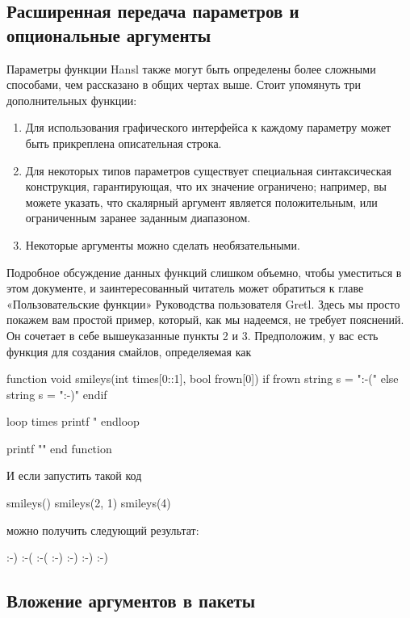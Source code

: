 \subsection{Расширенная передача параметров и опциональные аргументы}

Параметры функции Hansl также могут быть определены более сложными
способами, чем рассказано в общих чертах выше. Стоит упомянуть три
дополнительных функции:

\begin{enumerate}
\item Для использования графического интерфейса к каждому параметру
  может быть прикреплена описательная строка.
\item Для некоторых типов параметров существует специальная
  синтаксическая конструкция, гарантирующая, что их значение
  ограничено; например, вы можете указать, что скалярный аргумент
  является положительным, или ограниченным заранее заданным
  диапазоном.
\item Некоторые аргументы можно сделать необязательными.
\end{enumerate}
Подробное обсуждение данных функций слишком объемно, чтобы уместиться
в этом документе, и заинтересованный читатель может обратиться к главе
«Пользовательские функции» Руководства пользователя Gretl. Здесь мы
просто покажем вам простой пример, который, как мы надеемся, не
требует пояснений. Он сочетает в себе вышеуказанные пункты 2 и
3. Предположим, у вас есть функция для создания смайлов, определяемая
как
\begin{code}
function void smileys(int times[0::1], bool frown[0])
    if frown
        string s = ":-("
    else
        string s = ":-)"
    endif
    
    loop times
        printf "%
    endloop
    
    printf "\n"
end function
\end{code}

И если запустить такой код 
\begin{code}
smileys()
smileys(2, 1)
smileys(4)
\end{code}

можно получить следующий результат:

\begin{code}
:-) 
:-( :-( 
:-) :-) :-) :-) 
\end{code}

\subsection{Вложение аргументов в пакеты}

